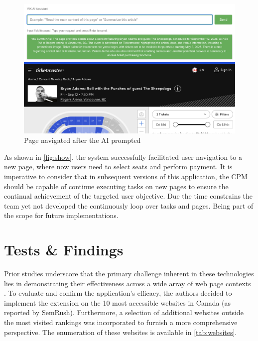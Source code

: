 \documentclass[conference]{IEEEtran}
\begin{document}
\begin{figure}[h]
\centering
\includegraphics[width=\columnwidth]{images/4.png}
\caption{Page navigated after the AI prompted}
\label{fig:show}
\end{figure}

As shown in \autoref{fig:show}, the system successfully facilitated user navigation to a new page, where now users need to select seats and perform payment. It is imperative to consider that in subsequent versions of this application, the CPM should be capable of continue executing tasks on new pages to ensure the continual achievement of the targeted user objective. Due the time constrains the team yet not developed the continuously loop over tasks and pages. Being part of the scope for future implementations.


\section{Tests \& Findings}\label{test}

Prior studies underscore that the primary challenge inherent in these technologies lies in demonstrating their effectiveness across a wide array of web page contexts \cite{prakash2024, he2024webvoyager}. To evaluate and confirm the application's efficacy, the authors decided to implement the extension on the 10 most accessible websites in Canada (as reported by SemRush).\cite{semrumsh} Furthermore, a selection of additional websites outside the most visited rankings was incorporated to furnish a more comprehensive perspective. The enumeration of these websites is available in \autoref{tab:websites}.
\end{document}
